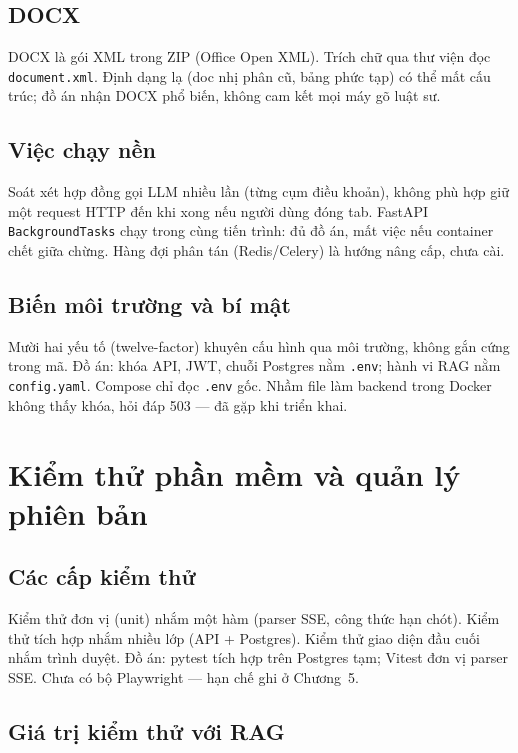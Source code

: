 \subsection{DOCX}

DOCX là gói XML trong ZIP (Office Open XML). Trích chữ qua thư viện đọc
\texttt{document.xml}. Định dạng lạ (doc nhị phân cũ, bảng phức tạp) có thể mất
cấu trúc; đồ án nhận DOCX phổ biến, không cam kết mọi máy gõ luật sư.

\subsection{Việc chạy nền}

Soát xét hợp đồng gọi LLM nhiều lần (từng cụm điều khoản), không phù hợp giữ
một request HTTP đến khi xong nếu người dùng đóng tab. FastAPI
\texttt{BackgroundTasks} chạy trong cùng tiến trình: đủ đồ án, mất việc nếu
container chết giữa chừng. Hàng đợi phân tán (Redis/Celery) là hướng nâng cấp,
chưa cài.

\subsection{Biến môi trường và bí mật}

Mười hai yếu tố (twelve-factor) khuyên cấu hình qua môi trường, không gắn cứng
trong mã. Đồ án: khóa API, JWT, chuỗi Postgres nằm \texttt{.env}; hành vi RAG
nằm \texttt{config.yaml}. Compose chỉ đọc \texttt{.env} gốc. Nhầm file làm backend
trong Docker không thấy khóa, hỏi đáp 503 --- đã gặp khi triển khai.

\section{Kiểm thử phần mềm và quản lý phiên bản}

\subsection{Các cấp kiểm thử}

Kiểm thử đơn vị (unit) nhắm một hàm (parser SSE, công thức hạn chót). Kiểm thử
tích hợp nhắm nhiều lớp (API + Postgres). Kiểm thử giao diện đầu cuối nhắm trình
duyệt. Đồ án: pytest tích hợp trên Postgres tạm; Vitest đơn vị parser SSE. Chưa
có bộ Playwright --- hạn chế ghi ở Chương~5.

\subsection{Giá trị kiểm thử với RAG}

